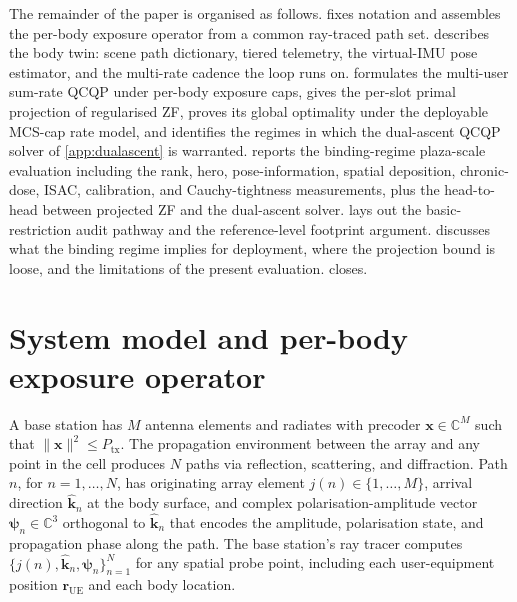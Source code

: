 \documentclass[journal,twocolumn,10pt]{IEEEtran}
\theoremstyle{plain}
\theoremstyle{remark}
\newcommand{\khat}{\hat{\bm{k}}}
\newcommand{\rr}{\mathbf{r}}
\newcommand{\xx}{\mathbf{x}}
\newcommand{\psin}{\bm{\psi}_n}
\newcommand{\Complex}{\mathbb{C}}
\begin{document}
The remainder of the paper is organised as follows.
 fixes notation and assembles the per-body exposure
operator from a common ray-traced path set.  describes
the body twin: scene path dictionary, tiered telemetry,
the virtual-IMU pose estimator, and the multi-rate cadence the loop
runs on.  formulates the multi-user sum-rate
QCQP under per-body exposure caps, gives the per-slot primal
projection of regularised ZF, proves its global optimality under
the deployable MCS-cap rate model, and identifies the regimes in
which the dual-ascent QCQP solver of \cref{app:dualascent} is
warranted.  reports the binding-regime plaza-scale
evaluation including the rank, hero, pose-information, spatial
deposition, chronic-dose, ISAC, calibration, and Cauchy-tightness
measurements, plus the head-to-head between projected ZF and the
dual-ascent solver.  lays out the
basic-restriction audit pathway and the reference-level footprint
argument.  discusses what the binding regime
implies for deployment, where the projection bound is loose, and
the limitations of the present
evaluation.  closes.


\section{System model and per-body exposure operator}\label{sec:setup}

A base station has $M$ antenna elements and radiates with precoder
$\xx \in \Complex^M$ such that $\|\xx\|^2 \leq P_{\mathrm{tx}}$. The
propagation environment between the array and any point in the cell
produces $N$ paths via reflection, scattering, and diffraction. Path
$n$, for $n = 1, \ldots, N$, has originating array element
$j(n) \in \{1, \ldots, M\}$, arrival direction $\khat_n$ at the
body surface, and complex polarisation-amplitude vector
$\psin \in \Complex^3$ orthogonal to $\khat_n$ that encodes the
amplitude, polarisation state, and propagation phase along the path.
The base station's ray tracer computes
$\{j(n), \khat_n, \psin\}_{n=1}^N$ for any spatial probe point,
including each user-equipment position $\rr_{\mathrm{UE}}$ and each
body location.
\end{document}
